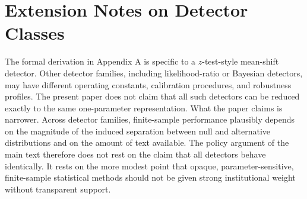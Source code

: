 \documentclass[11pt]{article}
\begin{document}
\section{Extension Notes on Detector Classes}
The formal derivation in Appendix A is specific to a $z$-test-style mean-shift
detector. Other detector families, including likelihood-ratio or Bayesian detectors,
may have different operating constants, calibration procedures, and robustness
profiles. The present paper does not claim that all such detectors can be reduced
exactly to the same one-parameter representation.
What the paper claims is narrower. Across detector families, finite-sample
performance plausibly depends on the magnitude of the induced separation between null
and alternative distributions and on the amount of text available. The policy
argument of the main text therefore does not rest on the claim that all detectors
behave identically. It rests on the more modest point that opaque,
parameter-sensitive, finite-sample statistical methods should not be given strong
institutional weight without transparent support.
\end{document}
